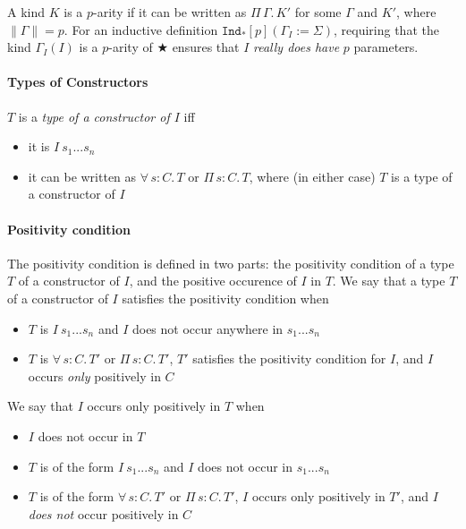 \documentclass{article}
\newcommand{\abs}[4]{{#1}\, #2\! : \! #3.\, #4}
\newcommand{\absu}[3]{{#1}\, #2.\, #3}
\newcommand{\indast}[4]{\texttt{Ind}_{\text{#1}} [#2] (#3 := #4)}
\newcommand{\lenc}[1]{\|#1\|}
\begin{document}
A kind $K$ is a $p$-arity if it can be written as $\absu{\Pi}{\Gamma}{K'}$ for
some $\Gamma$ and $K'$, where $\lenc{\Gamma} = p$. For an inductive definition
$\indast{*}{p}{\Gamma_I}{\Sigma}$, requiring that the kind $\Gamma_{I}(I)$ is a $p$-arity
of ★ ensures that $I$ \textit{really does have} $p$ parameters.

\paragraph{Types of Constructors}

$T$ is a \textit{type of a constructor of $I$} iff
\begin{itemize}
\item it is $I\ s_1 ... s_n$
\item it can be written as $\abs{\forall}{s}{C}{T}$ or $\abs{\Pi}{s}{C}{T}$,
  where (in either case) $T$ is a type of a constructor of $I$
\end{itemize}

\paragraph{Positivity condition}
The positivity condition is defined in two parts: the positivity condition of
a type $T$ of a constructor of $I$, and the positive occurence of $I$ in $T$.
We say that a type $T$ of a constructor of $I$ satisfies the positivity condition
when

\begin{itemize}
\item $T$ is $I\ s_1... s_n$ and $I$ does not occur anywhere in $s_1...s_n$
\item $T$ is $\abs{\forall}{s}{C}{T'}$ or $\abs{\Pi}{s}{C}{T'}$, $T'$ satisfies
  the positivity condition for $I$, and $I$ occurs \textit{only} positively in $C$ 
\end{itemize}

\noindent We say that $I$ occurs only positively in $T$ when
\begin{itemize}
\item $I$ does not occur in $T$
\item $T$ is of the form $I\ s_1 ... s_n$ and $I$ does not occur in $s_1 ...
  s_n$
\item $T$ is of the form $\abs{\forall}{s}{C}{T'}$ or $\abs{\Pi}{s}{C}{T'}$, $I$
  occurs only positively in $T'$, and $I$ \textit{does not} occur positively in $C$
\end{itemize}
\end{document}
